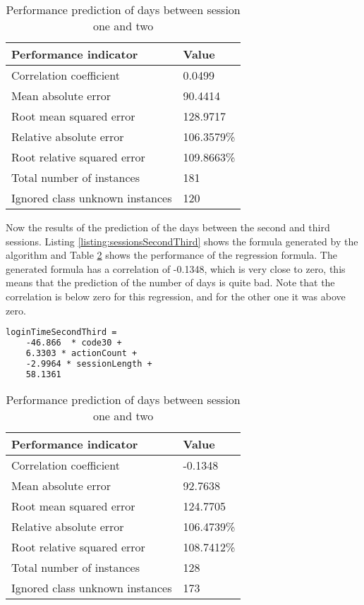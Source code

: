 \begin{table}[]
	\centering
	\caption{Performance prediction of days between session one and two}
	\label{table:sessionsFirstSecond}
	\begin{tabular}{@{}ll@{}}
		\toprule
		\textbf{Performance indicator}  & \textbf{Value} \\ \midrule
		Correlation coefficient         & 0.0499         \\
		Mean absolute error             & 90.4414        \\
		Root mean squared error         & 128.9717       \\
		Relative absolute error         & 106.3579\%     \\
		Root relative squared error     & 109.8663\%     \\
		Total number of instances       & 181            \\
		Ignored class unknown instances & 120            \\ \bottomrule
	\end{tabular}
\end{table}

Now the results of the prediction of the days between the second and third sessions. Listing \ref{listing:sessionsSecondThird} shows the formula generated by the  algorithm and Table \ref{table:sessionsSecondThird} shows the performance of the regression formula. The generated formula has a correlation of -0.1348, which is very close to zero, this means that the prediction of the number of days is quite bad. Note that the correlation is below zero for this regression, and for the other one it was above zero.

\begin{lstlisting}[caption={Formula prediction of days between session one and two}, label=listing:sessionsSecondThird, float=htpb, language=xml]
loginTimeSecondThird =
	-46.866  * code30 +
	6.3303 * actionCount +
	-2.9964 * sessionLength +
	58.1361
\end{lstlisting}

\begin{table}[]
	\centering
	\caption{Performance prediction of days between session one and two}
	\label{table:sessionsSecondThird}
	\begin{tabular}{@{}ll@{}}
		\toprule
		\textbf{Performance indicator}  & \textbf{Value} \\ \midrule
		Correlation coefficient         & -0.1348        \\
		Mean absolute error             & 92.7638        \\
		Root mean squared error         & 124.7705       \\
		Relative absolute error         & 106.4739\%     \\
		Root relative squared error     & 108.7412\%     \\
		Total number of instances       & 128            \\
		Ignored class unknown instances & 173            \\ \bottomrule
	\end{tabular}
\end{table}






